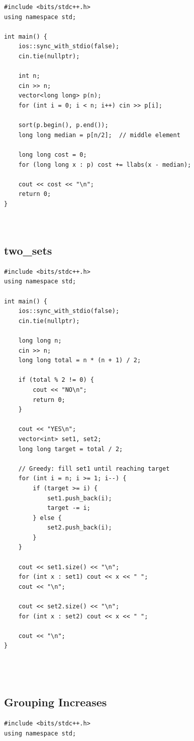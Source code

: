 \documentclass[a4paper,10pt,oneside]{article}
\begin{document}
\begin{multicols*}{\COLS}
\begin{lstlisting}
#include <bits/stdc++.h>
using namespace std;

int main() {
    ios::sync_with_stdio(false);
    cin.tie(nullptr);

    int n;
    cin >> n;
    vector<long long> p(n);
    for (int i = 0; i < n; i++) cin >> p[i];

    sort(p.begin(), p.end());
    long long median = p[n/2];  // middle element

    long long cost = 0;
    for (long long x : p) cost += llabs(x - median);

    cout << cost << "\n";
    return 0;
}



\end{lstlisting}
\subsection{two_sets}
\begin{lstlisting}
#include <bits/stdc++.h>
using namespace std;

int main() {
    ios::sync_with_stdio(false);
    cin.tie(nullptr);

    long long n;
    cin >> n;
    long long total = n * (n + 1) / 2;

    if (total % 2 != 0) {
        cout << "NO\n";
        return 0;
    }

    cout << "YES\n";
    vector<int> set1, set2;
    long long target = total / 2;

    // Greedy: fill set1 until reaching target
    for (int i = n; i >= 1; i--) {
        if (target >= i) {
            set1.push_back(i);
            target -= i;
        } else {
            set2.push_back(i);
        }
    }

    cout << set1.size() << "\n";
    for (int x : set1) cout << x << " ";
    cout << "\n";

    cout << set2.size() << "\n";
    for (int x : set2) cout << x << " ";
    
    cout << "\n";
}




\end{lstlisting}

\subsection{Grouping Increases}
\begin{lstlisting}
#include <bits/stdc++.h>
using namespace std;


\end{lstlisting}
\end{multicols*}
\end{document}
